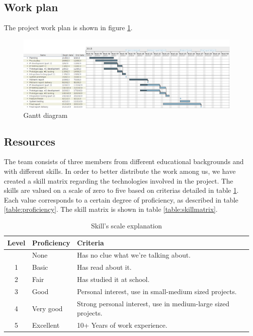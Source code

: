 \subsection{Work plan}
\label{section:workplan}

The project work plan is shown in figure \ref{figure:work-splan}.

\newpage
\begin{landscape}
\begin{figure}[h]
\includegraphics[scale=0.66]{../Figures/gantt-diagram.png}
\caption{Gantt diagram}
\label{figure:work-splan}
\end{figure}
\end{landscape}


\subsection{Resources}
\label{section:resources}
The team consists of three members from different educational backgrounds and with different skills.
In order to better distribute the work among us, we have created a skill matrix regarding the technologies involved in the project.
The skills are valued on a scale of zero to five based on criterias detailed in table \ref{table:skillscale}.
Each value corresponds to a certain degree of proficiency, as described in table \ref{table:proficiency}.
The skill matrix is shown in table \ref{table:skillmatrix}.

\begin{table}[h]
\begin{center}
\begin{tabular}{ | c | l | l | }
  \hline
  Level & Proficiency & Criteria \\
  \hline\noalign{\smallskip}\noalign{\smallskip}\hline
  0 & None		& Has no clue what we're talking about. \\
  1 & Basic		& Has read about it.\\
  2 & Fair		& Has studied it at school.\\
  3 & Good		& Personal interest, use in small-medium sized projects.\\
  4 & Very good	& Strong personal interest, use in medium-large sized projects. \\
  5 & Excellent	& 10+ Years of work experience. \\
  \hline
\end{tabular}
\end{center}
\caption{Skill's scale explanation}
\label{table:skillscale}
\end{table}

